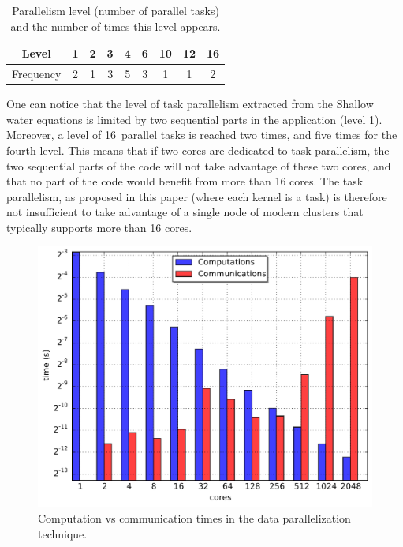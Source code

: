 \begin{table}[th]
 \begin{center}
 \begin{tabular}{|c|c|c|c|c|c|c|c|c|}
   Level & 1 & 2 & 3 & 4 & 6 & 10 & 12 & 16\\
   \hline
   Frequency & 2 & 1 & 3 & 5 & 3 & 1 & 1 & 2\\
 \end{tabular}
\caption{Parallelism level (number of parallel tasks) and the number of times this level appears.}
\label{fig:freq}
 \end{center}
\end{table}

One can notice that the level of task parallelism extracted from the Shallow water equations is limited by two sequential parts in the application (level 1). Moreover, a level of 16~parallel tasks is reached two times, and five times for the fourth level.
This means that if two cores are dedicated to task parallelism, the two sequential parts of the code will not take advantage of these two cores, and that no part of the code would benefit from more than 16 cores. The task parallelism, as proposed in this paper (\ie where each kernel is a task) is therefore not insufficient to take advantage of a single node of modern clusters that typically supports more than 16 cores.

\begin{figure}[th]\begin{center}
  \includegraphics[width=.6\textwidth]{../results/task_scaling/500_200/analytic/times.pdf}
  \caption{Computation vs communication times in the data parallelization technique.}
  \label{fig:limit}
\end{center}\end{figure}

